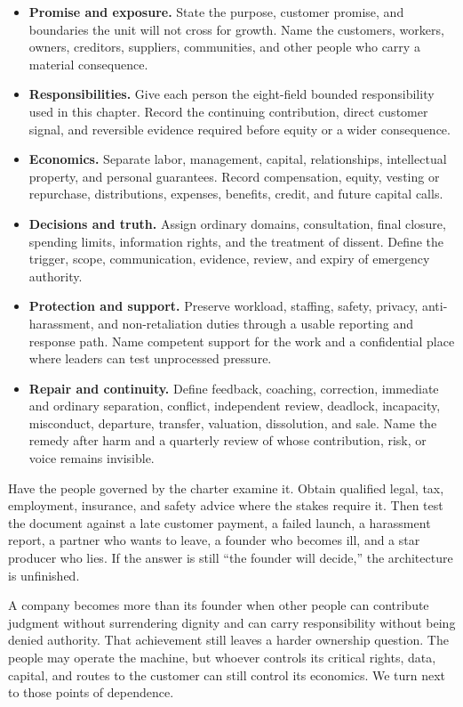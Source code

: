 \begin{itemize}[leftmargin=0pt,label={},labelsep=0pt,itemsep=0.18em,
  parsep=0pt,topsep=0.35em]
\item \textbf{Promise and exposure.} State the purpose, customer promise, and
  boundaries the unit will not cross for growth. Name the customers, workers,
  owners, creditors, suppliers, communities, and other people who carry a
  material consequence.
\item \textbf{Responsibilities.} Give each person the eight-field bounded
  responsibility used in this chapter. Record the continuing contribution,
  direct customer signal, and reversible evidence required before equity or a
  wider consequence.
\item \textbf{Economics.} Separate labor, management, capital, relationships,
  intellectual property, and personal guarantees. Record compensation,
  equity, vesting or repurchase, distributions, expenses, benefits, credit,
  and future capital calls.
\item \textbf{Decisions and truth.} Assign ordinary domains, consultation,
  final closure, spending limits, information rights, and the treatment of
  dissent. Define the trigger, scope, communication, evidence, review, and
  expiry of emergency authority.
\item \textbf{Protection and support.} Preserve workload, staffing, safety,
  privacy, anti-harassment, and non-retaliation duties through a usable
  reporting and response path. Name competent support for the work and a
  confidential place where leaders can test unprocessed pressure.
\item \textbf{Repair and continuity.} Define feedback, coaching, correction,
  immediate and ordinary separation, conflict, independent review, deadlock,
  incapacity, misconduct, departure, transfer, valuation, dissolution, and
  sale. Name the remedy after harm and a quarterly review of whose
  contribution, risk, or voice remains invisible.
\end{itemize}

Have the people governed by the charter examine it. Obtain qualified legal,
tax, employment, insurance, and safety advice where the stakes require it.
Then test the document against a late customer payment, a failed launch, a
harassment report, a partner who wants to leave, a founder who becomes ill, and
a star producer who lies. If the answer is still ``the founder will decide,''
the architecture is unfinished.

A company becomes more than its founder when other people can contribute
judgment without surrendering dignity and can carry responsibility without
being denied authority. That achievement still leaves a harder ownership
question. The people may operate the machine, but whoever controls its critical
rights, data, capital, and routes to the customer can still control its
economics. We turn next to those points of dependence.
